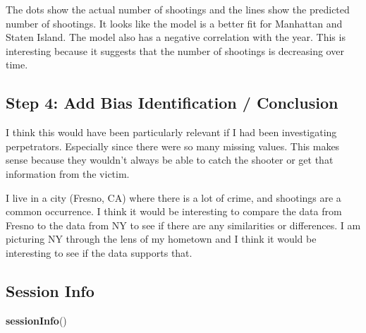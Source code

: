 \documentclass[
]{article}
\newenvironment{Shaded}{\begin{snugshade}}{\end{snugshade}}
\newcommand{\FunctionTok}[1]{\textcolor[rgb]{0.13,0.29,0.53}{\textbf{#1}}}
\newcommand{\NormalTok}[1]{#1}
\begin{document}
The dots show the actual number of shootings and the lines show the
predicted number of shootings. It looks like the model is a better fit
for Manhattan and Staten Island. The model also has a negative
correlation with the year. This is interesting because it suggests that
the number of shootings is decreasing over time.

\subsection{Step 4: Add Bias Identification /
Conclusion}\label{step-4-add-bias-identification-conclusion}

I think this would have been particularly relevant if I had been
investigating perpetrators. Especially since there were so many missing
values. This makes sense because they wouldn't always be able to catch
the shooter or get that information from the victim.

I live in a city (Fresno, CA) where there is a lot of crime, and
shootings are a common occurrence. I think it would be interesting to
compare the data from Fresno to the data from NY to see if there are any
similarities or differences. I am picturing NY through the lens of my
hometown and I think it would be interesting to see if the data supports
that.

\subsection{Session Info}\label{session-info}

\begin{Shaded}
\begin{Highlighting}[]
\FunctionTok{sessionInfo}\NormalTok{()}
\end{Highlighting}
\end{Shaded}
\end{document}
